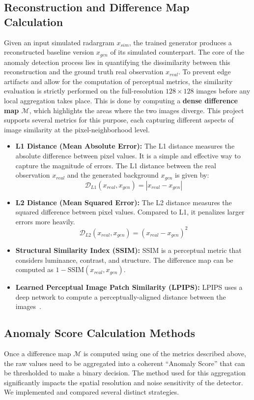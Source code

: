 \subsection{Reconstruction and Difference Map Calculation}
Given an input simulated radargram $x_{sim}$, the trained generator produces a reconstructed baseline version $x_{gen}$ of its simulated counterpart.
The core of the anomaly detection process lies in quantifying the dissimilarity between this reconstruction and the ground truth real observation $x_{real}$.
To prevent edge artifacts and allow for the computation of perceptual metrics, the similarity evaluation is strictly performed on the full-resolution $128 \times 128$ images before any local aggregation takes place.
This is done by computing a \textbf{dense difference map $\mathcal{M}$}, which highlights the areas where the two images diverge.
This project supports several metrics for this purpose, each capturing different aspects of image similarity at the pixel-neighborhood level.

\begin{itemize}
    \item \textbf{L1 Distance (Mean Absolute Error):} The L1 distance measures the absolute difference between pixel values. It is a simple and effective way to capture the magnitude of errors. The L1 distance between the real observation $x_{real}$ and the generated background $x_{gen}$ is given by:
    $$ \mathcal{D}_{L1}(x_{real}, x_{gen}) = |x_{real} - x_{gen}| $$

    \item \textbf{L2 Distance (Mean Squared Error):} The L2 distance measures the squared difference between pixel values. Compared to L1, it penalizes larger errors more heavily.
    $$ \mathcal{D}_{L2}(x_{real}, x_{gen}) = (x_{real} - x_{gen})^2 $$

    \item \textbf{Structural Similarity Index (SSIM):} SSIM is a perceptual metric that considers luminance, contrast, and structure. The difference map can be computed as $1 - \text{SSIM}(x_{real}, x_{gen})$.

    \item \textbf{Learned Perceptual Image Patch Similarity (LPIPS):} LPIPS uses a deep network to compute a perceptually-aligned distance between the images~\cite{Zhang_2018_CVPR}.
\end{itemize}

\subsection{Anomaly Score Calculation Methods}
Once a difference map $\mathcal{M}$ is computed using one of the metrics described above, the raw values need to be aggregated into a coherent \enquote{Anomaly Score} that can be thresholded to make a binary decision.
The method used for this aggregation significantly impacts the spatial resolution and noise sensitivity of the detector.
We implemented and compared several distinct strategies.


